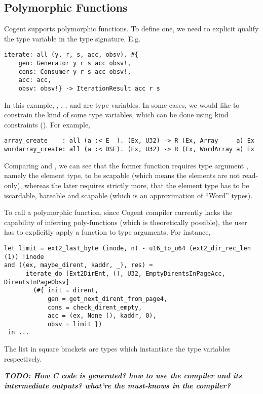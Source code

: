 \documentclass[a4paper]{article}
\newcommand{\TODO}[1]{\textbf{\textsl{TODO: #1}}}
\newcommand{\cogent}{Cogent\xspace}
\newcommand{\Cogent}{\cogent\xspace}
\begin{document}
\subsection{Polymorphic Functions}
\Cogent supports polymorphic functions. To define one, we need to explicit qualify the type variable
in the type signature. E.g.\
\begin{lstlisting}[language=Cogent]
iterate: all (y, r, s, acc, obsv). #{
	gen: Generator y r s acc obsv!,
	cons: Consumer y r s acc obsv!,
	acc: acc,
	obsv: obsv!} -> IterationResult acc r s
\end{lstlisting}
In this example, , , ,  and  are type variables. In some cases,
we would like to constrain the kind of some type variables, which can be done using kind constraints (\code{:<}).
For example,
\begin{lstlisting}[language=Cogent]
array_create    : all (a :< E  ). (Ex, U32) -> R (Ex, Array     a) Ex
wordarray_create: all (a :< DSE). (Ex, U32) -> R (Ex, WordArray a) Ex
\end{lstlisting}
Comparing  and , we can see that the former function requires type argument
\code{a}, namely the element type, to be \code{E}scapable (which means the elements are not read-only), whereas
the later requires strictly more, that the element type
has to be iscardable, hareable and scapable (which is an approximation of ``Word'' types).

To call a polymorphic function, since \cogent compiler currently lacks the capability of inferring poly-functions (which is
theoretically possible), the user has to explicitly apply a function to type arguments. For instance,
\begin{lstlisting}[language=Cogent]
let limit = ext2_last_byte (inode, n) - u16_to_u64 (ext2_dir_rec_len (1)) !inode
and ((ex, maybe_dirent, kaddr, _), res) =
      iterate_do [Ext2DirEnt, (), U32, EmptyDirentsInPageAcc, DirentsInPageObsv]
        (#{ init = dirent,
            gen = get_next_dirent_from_page4,
            cons = check_dirent_empty,
            acc = (ex, None (), kaddr, 0),
            obsv = limit })
 in ...
\end{lstlisting}
The list in square brackets are types which instantiate the type variables respectively.

\TODO{How C code is generated? how to use the compiler and its intermediate outputs? what're the must-knows in the compiler?}
\end{document}
